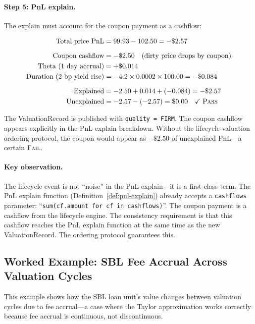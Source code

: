 \documentclass[11pt,a4paper]{article}
\begin{document}
\paragraph{Step 5: PnL explain.}  The explain must account for the coupon payment as a cashflow:

\begin{align*}
\text{Total price PnL} &= 99.93 - 102.50 = -\$2.57 \\[6pt]
\text{Coupon cashflow} &= -\$2.50 \quad\text{(dirty price drops by coupon)} \\
\text{Theta (1 day accrual)} &= +\$0.014 \\
\text{Duration (2 bp yield rise)} &= -4.2 \times 0.0002 \times 100.00 = -\$0.084 \\[6pt]
\text{Explained} &= -2.50 + 0.014 + (-0.084) = -\$2.57 \\
\text{Unexplained} &= -2.57 - (-2.57) = \$0.00 \quad\checkmark\;\textsc{Pass}
\end{align*}

\noindent The ValuationRecord is published with \texttt{quality = FIRM}.  The coupon cashflow appears explicitly in the PnL explain breakdown.  Without the lifecycle-valuation ordering protocol, the coupon would appear as $-\$2.50$ of unexplained PnL---a certain \textsc{Fail}.

\paragraph{Key observation.}  The lifecycle event is not ``noise'' in the PnL explain---it is a first-class term.  The PnL explain function (Definition~\ref{def:pnl-explain}) already accepts a \texttt{cashflows} parameter: ``\texttt{sum(cf.amount for cf in cashflows)}''.  The coupon payment is a cashflow from the lifecycle engine.  The consistency requirement is that this cashflow reaches the PnL explain function at the same time as the new ValuationRecord.  The ordering protocol guarantees this.

\subsection{Worked Example: SBL Fee Accrual Across Valuation Cycles}
\label{sec:worked-sbl}

This example shows how the SBL loan unit's value changes between valuation cycles due to fee accrual---a case where the Taylor approximation works correctly because fee accrual is continuous, not discontinuous.
\end{document}
